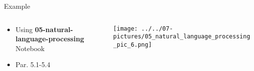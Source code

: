 \documentclass[11pt]{beamer}
\begin{document}
\begin{frame}{Example}
\begin{columns}[T] %
\begin{column}{.48\textwidth}
        \begin{itemize}
		\item Using \textbf{05-natural-language-processing} Notebook 
		\item Par. 5.1-5.4
        \end{itemize}
\end{column}%
\hfill%
\begin{column}{.48\textwidth}
        \texttt{[image: ../../07-pictures/05\_natural\_language\_processing\_pic\_6.png]}
\end{column}%
\end{columns}
\end{frame}
\end{document}
